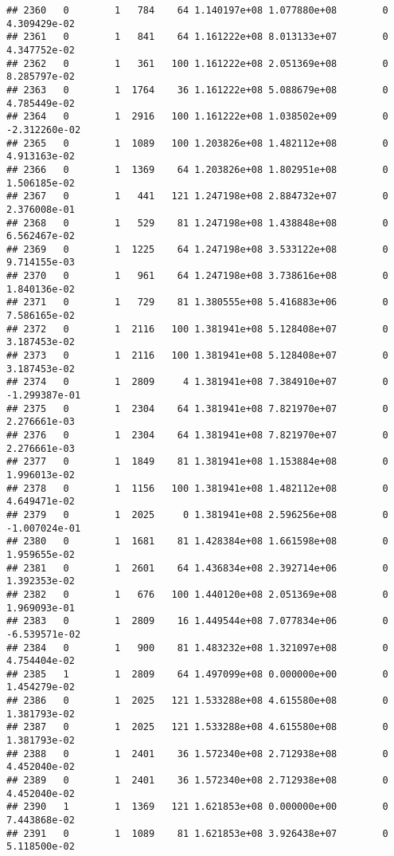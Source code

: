 \documentclass[
]{article}
\begin{document}
\begin{enumerate}
\begin{verbatim}
## 2360   0        1   784    64 1.140197e+08 1.077880e+08        0  4.309429e-02
## 2361   0        1   841    64 1.161222e+08 8.013133e+07        0  4.347752e-02
## 2362   0        1   361   100 1.161222e+08 2.051369e+08        0  8.285797e-02
## 2363   0        1  1764    36 1.161222e+08 5.088679e+08        0  4.785449e-02
## 2364   0        1  2916   100 1.161222e+08 1.038502e+09        0 -2.312260e-02
## 2365   0        1  1089   100 1.203826e+08 1.482112e+08        0  4.913163e-02
## 2366   0        1  1369    64 1.203826e+08 1.802951e+08        0  1.506185e-02
## 2367   0        1   441   121 1.247198e+08 2.884732e+07        0  2.376008e-01
## 2368   0        1   529    81 1.247198e+08 1.438848e+08        0  6.562467e-02
## 2369   0        1  1225    64 1.247198e+08 3.533122e+08        0  9.714155e-03
## 2370   0        1   961    64 1.247198e+08 3.738616e+08        0  1.840136e-02
## 2371   0        1   729    81 1.380555e+08 5.416883e+06        0  7.586165e-02
## 2372   0        1  2116   100 1.381941e+08 5.128408e+07        0  3.187453e-02
## 2373   0        1  2116   100 1.381941e+08 5.128408e+07        0  3.187453e-02
## 2374   0        1  2809     4 1.381941e+08 7.384910e+07        0 -1.299387e-01
## 2375   0        1  2304    64 1.381941e+08 7.821970e+07        0  2.276661e-03
## 2376   0        1  2304    64 1.381941e+08 7.821970e+07        0  2.276661e-03
## 2377   0        1  1849    81 1.381941e+08 1.153884e+08        0  1.996013e-02
## 2378   0        1  1156   100 1.381941e+08 1.482112e+08        0  4.649471e-02
## 2379   0        1  2025     0 1.381941e+08 2.596256e+08        0 -1.007024e-01
## 2380   0        1  1681    81 1.428384e+08 1.661598e+08        0  1.959655e-02
## 2381   0        1  2601    64 1.436834e+08 2.392714e+06        0  1.392353e-02
## 2382   0        1   676   100 1.440120e+08 2.051369e+08        0  1.969093e-01
## 2383   0        1  2809    16 1.449544e+08 7.077834e+06        0 -6.539571e-02
## 2384   0        1   900    81 1.483232e+08 1.321097e+08        0  4.754404e-02
## 2385   1        1  2809    64 1.497099e+08 0.000000e+00        0  1.454279e-02
## 2386   0        1  2025   121 1.533288e+08 4.615580e+08        0  1.381793e-02
## 2387   0        1  2025   121 1.533288e+08 4.615580e+08        0  1.381793e-02
## 2388   0        1  2401    36 1.572340e+08 2.712938e+08        0  4.452040e-02
## 2389   0        1  2401    36 1.572340e+08 2.712938e+08        0  4.452040e-02
## 2390   1        1  1369   121 1.621853e+08 0.000000e+00        0  7.443868e-02
## 2391   0        1  1089    81 1.621853e+08 3.926438e+07        0  5.118500e-02

\end{verbatim}
\end{enumerate}
\end{document}
